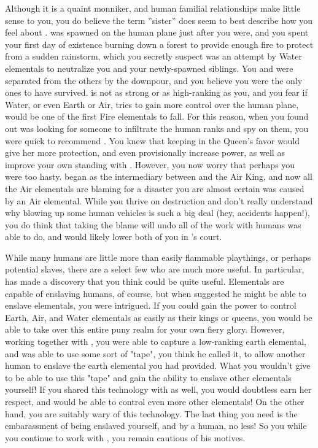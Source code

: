 \documentclass[char]{elementals}
\begin{document}
Although it is a quaint monniker, and human familial relationships make little sense to you, you do believe the term ''sister'' does seem to best describe how you feel about \cJuliet{}.  \cJuliet{\they} was spawned on the human plane just after you were, and you spent your first day of existence burning down a forest to provide enough fire to protect \cJuliet{\them} from a sudden rainstorm, which you secretly suspect was an attempt by Water elementals to neutralize you and your newly-spawned siblings.  You and \cJuliet{} were separated from the others by the downpour, and you believe you were the only ones to have survived. \cJuliet{\they} is not as strong or as high-ranking as you, and you fear if Water, or even Earth or Air, tries to gain more control over the human plane, \cJuliet{\they} would be one of the first Fire elementals to fall. For this reason, when you found out \cQueen{} was looking for someone to infiltrate the human ranks and spy on them, you were quick to recommend \cJuliet{}.  You knew that keeping \cJuliet{\them} in the Queen's favor would give her more protection, and even provisionally increase  power, as well as improve your own standing with \cQueen{}.  However, you now worry that perhaps you were too hasty.  \cJuliet{} began as the intermediary between \cQueen{} and the Air King, and now all the Air elementals are blaming \cJuliet{\them} for a disaster you are almost certain was caused by an Air elemental.  While you thrive on destruction and don't really understand why blowing up some human vehicles is such a big deal (hey, accidents happen!), you do think that \cJuliet{} taking the blame will undo all of the work with humans \cJuliet{\they} was able to do, and would likely lower both of you in \cQueen{}'s court.

While many humans are little more than easily flammable playthings, or perhaps potential slaves, there are a select few who are much more useful.  In particular, \cmadScientist{\intro} has made a discovery that you think could be quite useful.  Elementals are capable of enslaving humans, of course, but when \cmadScientist{} suggested he might be able to enslave elementals, you were intrigued.  If you could gain the power to control Earth, Air, and Water elementals as easily as their kings or queens, you would be able to take over this entire puny realm for your own fiery glory.  However, working together with \madScientist{}, you were able to capture a low-ranking earth elemental, and \madScientist{} was able to use some sort of "tape", you think he called it, to allow another human to enslave the earth elemental you had provided.  What you wouldn't give to be able to use this "tape" and gain the ability to enslave other elementals yourself!  If you shared this technology with \cQueen{} as well, you would doubtless earn her respect, and  would be able to control even more other elementals!  On the other hand, you are suitably wary of this technology.  The last thing you need is the embarassment of being enslaved yourself, and by a human, no less!  So you while you continue to work with \madScientist{}, you remain cautious of his motives.
\end{document}
